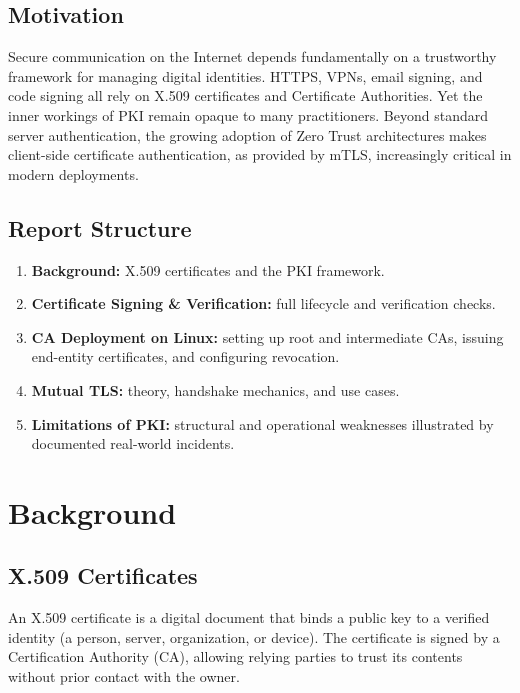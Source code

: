 \documentclass[10pt,twocolumn]{article}
\begin{document}
\subsection{Motivation}

Secure communication on the Internet depends fundamentally on a trustworthy
framework for managing digital identities. HTTPS, VPNs, email signing, and
code signing all rely on X.509 certificates and Certificate Authorities. Yet
the inner workings of PKI remain opaque to many practitioners. Beyond
standard server authentication, the growing adoption of Zero Trust
architectures makes client-side certificate authentication, as provided
by mTLS, increasingly critical in modern deployments.

\subsection{Report Structure}

\begin{enumerate}
  \item \textbf{Background:} X.509 certificates and the PKI framework.
  \item \textbf{Certificate Signing \& Verification:} full lifecycle and
        verification checks.
  \item \textbf{CA Deployment on Linux:} setting up root and intermediate CAs,
        issuing end-entity certificates, and configuring revocation.
  \item \textbf{Mutual TLS:} theory, handshake mechanics, and use cases.
  \item \textbf{Limitations of PKI:} structural and operational weaknesses
        illustrated by documented real-world incidents.
\end{enumerate}

\section{Background}

\subsection{X.509 Certificates}

An X.509 certificate is a digital document that binds a public key to a
verified identity (a person, server, organization, or device). The
certificate is signed by a Certification Authority (CA), allowing relying
parties to trust its contents without prior contact with the owner.
\end{document}
